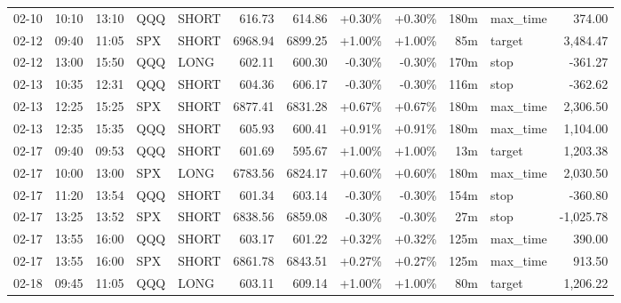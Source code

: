 \documentclass[11pt,a4paper,twoside]{article}
\begin{document}
\begin{center}
\begin{longtable}{>{\color{txtmain}}l l l l l r r r r r >{\color{txtmain}}l r}
02-10 & 10:10 & 13:10 & QQQ & SHORT & 616.73 & 614.86 & \textcolor{wingreen}{+0.30\%} & \textcolor{wingreen}{+0.30\%} & 180m & max\_time & \textcolor{wingreen}{374.00} \\
02-12 & 09:40 & 11:05 & SPX & SHORT & 6968.94 & 6899.25 & \textcolor{wingreen}{+1.00\%} & \textcolor{wingreen}{+1.00\%} & 85m & target & \textcolor{wingreen}{3,484.47} \\
02-12 & 13:00 & 15:50 & QQQ & LONG & 602.11 & 600.30 & \textcolor{lossred}{-0.30\%} & \textcolor{lossred}{-0.30\%} & 170m & stop & \textcolor{lossred}{-361.27} \\
02-13 & 10:35 & 12:31 & QQQ & SHORT & 604.36 & 606.17 & \textcolor{lossred}{-0.30\%} & \textcolor{lossred}{-0.30\%} & 116m & stop & \textcolor{lossred}{-362.62} \\
02-13 & 12:25 & 15:25 & SPX & SHORT & 6877.41 & 6831.28 & \textcolor{wingreen}{+0.67\%} & \textcolor{wingreen}{+0.67\%} & 180m & max\_time & \textcolor{wingreen}{2,306.50} \\
02-13 & 12:35 & 15:35 & QQQ & SHORT & 605.93 & 600.41 & \textcolor{wingreen}{+0.91\%} & \textcolor{wingreen}{+0.91\%} & 180m & max\_time & \textcolor{wingreen}{1,104.00} \\
02-17 & 09:40 & 09:53 & QQQ & SHORT & 601.69 & 595.67 & \textcolor{wingreen}{+1.00\%} & \textcolor{wingreen}{+1.00\%} & 13m & target & \textcolor{wingreen}{1,203.38} \\
02-17 & 10:00 & 13:00 & SPX & LONG & 6783.56 & 6824.17 & \textcolor{wingreen}{+0.60\%} & \textcolor{wingreen}{+0.60\%} & 180m & max\_time & \textcolor{wingreen}{2,030.50} \\
02-17 & 11:20 & 13:54 & QQQ & SHORT & 601.34 & 603.14 & \textcolor{lossred}{-0.30\%} & \textcolor{lossred}{-0.30\%} & 154m & stop & \textcolor{lossred}{-360.80} \\
02-17 & 13:25 & 13:52 & SPX & SHORT & 6838.56 & 6859.08 & \textcolor{lossred}{-0.30\%} & \textcolor{lossred}{-0.30\%} & 27m & stop & \textcolor{lossred}{-1,025.78} \\
02-17 & 13:55 & 16:00 & QQQ & SHORT & 603.17 & 601.22 & \textcolor{wingreen}{+0.32\%} & \textcolor{wingreen}{+0.32\%} & 125m & max\_time & \textcolor{wingreen}{390.00} \\
02-17 & 13:55 & 16:00 & SPX & SHORT & 6861.78 & 6843.51 & \textcolor{wingreen}{+0.27\%} & \textcolor{wingreen}{+0.27\%} & 125m & max\_time & \textcolor{wingreen}{913.50} \\
02-18 & 09:45 & 11:05 & QQQ & LONG & 603.11 & 609.14 & \textcolor{wingreen}{+1.00\%} & \textcolor{wingreen}{+1.00\%} & 80m & target & \textcolor{wingreen}{1,206.22} \\

\end{longtable}
\end{center}
\end{document}
